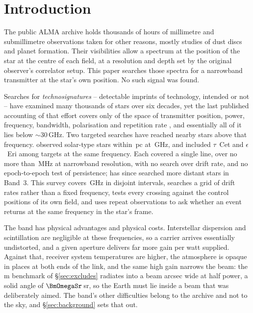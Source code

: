 \section{Introduction}
\label{sec:intro}

The public ALMA archive holds thousands of hours of millimetre and
submillimetre observations taken for other reasons, mostly studies of dust
discs and planet formation. Their visibilities allow a spectrum at the
position of the star at the centre of each field, at a resolution and depth
set by the original observer's correlator setup. This paper searches those
spectra for a narrowband transmitter at the star's own position. No such
signal was found.

Searches for \emph{technosignatures} -- detectable imprints of technology,
intended or not
\citep{Sheikh2020,SETIreview2025} -- have examined many thousands of stars
over six decades, yet the last published accounting of that effort covers
only \HaystackFrac{} of the space of transmitter position, power, frequency,
bandwidth, polarisation and repetition rate
\citep{Wright2018}, and essentially all of it lies below
${\sim}30$\,GHz. Two targeted searches have reached nearby stars above that frequency.
\citet{Steffes1994} observed \SbPriorNStarA{} solar-type stars within
\SbPriorDistA\,pc at \SbPriorFreqGHz\,GHz, and \citet{Mauersberger1996}
included $\tau$~Cet and $\epsilon$~Eri among \SbPriorNStarB{} targets at the
same frequency. Each covered a single line, over no more than
\SbPriorBandMHz\,MHz at narrowband resolution, with no search over drift rate,
and no epoch-to-epoch test of persistence;
\citet{Mason2025} has since searched more distant stars in
Band~3. This survey covers
\DnuA\,GHz in \CovNIslands{} disjoint intervals, searches a grid of drift rates rather
than a fixed frequency, tests every crossing against the \BdNCtrl{} control positions of
its own field, and uses repeat observations to ask whether an event returns
at the same frequency in the star's frame.

The band has physical advantages and physical costs. Interstellar dispersion
and scintillation are negligible at these frequencies, so a carrier arrives
essentially undistorted, and a given aperture delivers far more gain per watt
supplied. Against that, receiver system temperatures are higher, the
atmosphere is opaque in places at both ends of the link, and the same high
gain narrows the beam: the \BenchDiam\,m benchmark of
\S\ref{sec:excludes} radiates into a beam \BmArcsec{} arcsec wide at half
power, a solid angle of $\BmOmegaSr$\,sr, so
the Earth must lie inside a beam that was deliberately aimed. The band's other difficulties
belong to the archive and not to the sky, and
\S\ref{sec:background} sets that out.

